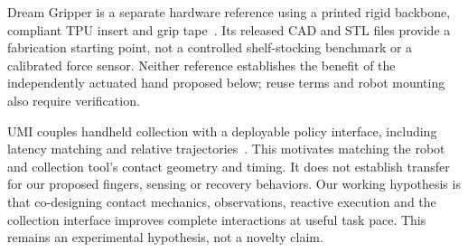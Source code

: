 Dream Gripper is a separate hardware reference using a printed rigid backbone,
compliant TPU insert and grip tape~\citep{dreamgripper2026}. Its released CAD and
STL files provide a fabrication starting point, not a controlled shelf-stocking
benchmark or a calibrated force sensor. Neither reference establishes the benefit
of the independently actuated hand proposed below; reuse terms and robot mounting
also require verification.

UMI couples handheld collection with a deployable policy interface, including
latency matching and relative trajectories~\citep{chi2024umi}. This motivates
matching the robot and collection tool's contact geometry and timing. It does
not establish transfer for our proposed fingers, sensing or recovery behaviors.
Our working hypothesis is that co-designing contact mechanics, observations,
reactive execution and the collection interface improves complete interactions
at useful task pace. This remains an experimental hypothesis, not a novelty claim.
